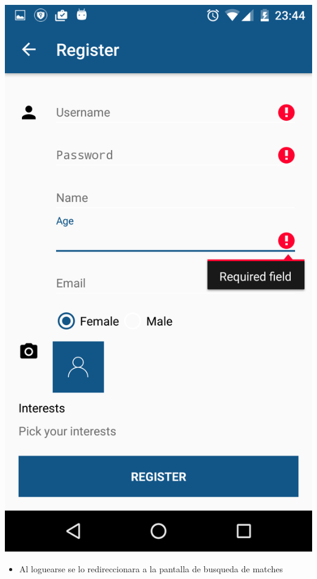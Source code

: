 \documentclass[letterpaper,10pt,english]{sphinxmanual}
\begin{document}
\includegraphics{registro_failed.png}
\begin{itemize}
\item {} 
Al loguearse se lo redireccionara a la pantalla de busqueda de matches

\end{itemize}
\end{document}
